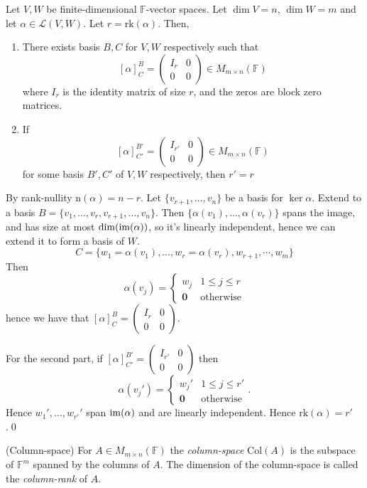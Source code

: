 \documentclass{article}
\newcommand{\F}{\mathbb{F}}
\newcommand{\n}{\mathrm{n}}
\newcommand{\rk}{\mathrm{rk}}
\newcommand{\Col}{\mathrm{Col}}
\begin{document}
\begin{theorem}
  Let $ V,W $ be finite-dimensional $ \F $-vector spaces. Let $ \dim V=n $, $ \dim W=m $ and let $ \alpha\in\mathcal L(V,W) $. Let $ r=\rk(\alpha) $. Then,
  \begin{enumerate}
	  \item There exists basis $ B,C $ for $ V,W $ respectively such that
		  \[
			  [\alpha]^B_C=\begin{pmatrix}
				  I_r & 0 \\
				  0 & 0
			  \end{pmatrix}\in M_{m\times n}(\F)
		  \]
		  where $ I_r $ is the identity matrix of size $ r $, and the zeros are block zero matrices.
	  \item If \[
			  [\alpha]^{B'}_{C'}=\begin{pmatrix}
				  I_{r'} & 0 \\
				  0 & 0
			  \end{pmatrix}\in M_{m\times n}(\F)
		  \]
		  for some basis $ B',C'$ of $ V,W $ respectively, then $ r'=r $
  \end{enumerate}
\end{theorem}
\pf By rank-nullity $ \n(\alpha)=n-r $. Let $ \{v_{r+1},\dots, v_n\} $ be a basis for $ \ker\alpha $. Extend to a basis $ B=\{v_1,\dots, v_r,v_{r+1},\dots, v_n\} $. Then $ \{\alpha(v_1),\dots, \alpha(v_r)\} $ spans the image, and has size at most $ \dim(\operatorname{im}(\alpha)) $, so it's linearly independent, hence we can extend it to form a basis of $ W $.
\[
	C=\{w_1=\alpha(v_1),\dots, w_r=\alpha(v_r),w_{r+1},\cdots, w_m\}
\]
Then
\[
  \alpha(v_j)=\begin{cases}
	  w_j & 1\le j\le r \\
	  \mathbf 0 & \text{otherwise}
  \end{cases}
\]
hence we have that $ [\alpha]^B_C= \begin{pmatrix}
				  I_{r} & 0 \\
				  0 & 0
			  \end{pmatrix} $.\par
			  For the second part, if $ [\alpha]^{B'}_{C'}= \begin{pmatrix}
				  I_{r'} & 0 \\
				  0 & 0
			  \end{pmatrix} $ then
			  \[
			    \alpha(v_j')=\begin{cases}
	  w_j' & 1\le j\le r' \\
	  \mathbf 0 & \text{otherwise}
  \end{cases}.
			  \]
			  Hence $ w_1',\dots, w_{r'}' $ span $ \operatorname{im}(\alpha) $ and are linearly independent. Hence $ \rk(\alpha)=r' $.\qed
\begin{definition}
	(Column-space) For $ A\in M_{m\times n}(\F) $ the \textit{column-space} $ \Col(A) $ is the subspace of $ \F^m $ spanned by the columns of $ A $. The dimension of the column-space is called the \textit{column-rank} of $ A $.
\end{definition}
\end{document}
